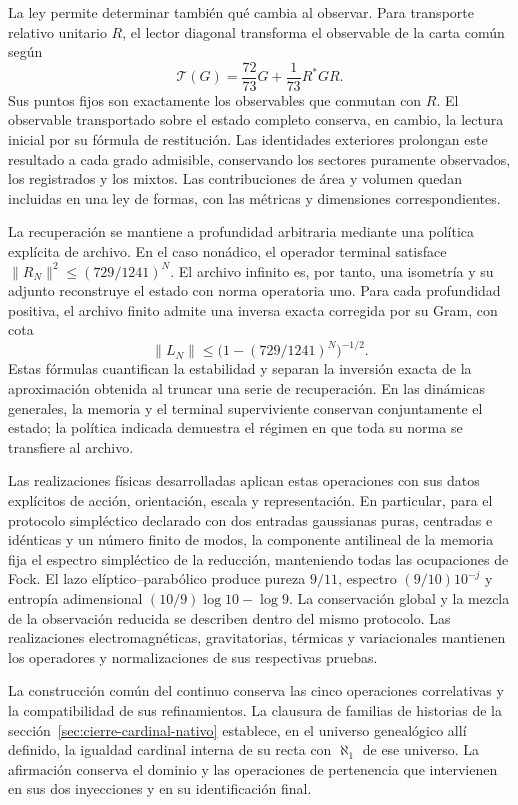 La ley permite determinar también qué cambia al observar. Para transporte relativo unitario \(R\), el lector diagonal transforma el observable de la carta común según
\[
 \mathcal T(G)=\frac{72}{73}G+\frac1{73}R^*GR.
\]
Sus puntos fijos son exactamente los observables que conmutan con \(R\). El observable transportado sobre el estado completo conserva, en cambio, la lectura inicial por su fórmula de restitución. Las identidades exteriores prolongan este resultado a cada grado admisible, conservando los sectores puramente observados, los registrados y los mixtos. Las contribuciones de área y volumen quedan incluidas en una ley de formas, con las métricas y dimensiones correspondientes.

La recuperación se mantiene a profundidad arbitraria mediante una política explícita de archivo. En el caso nonádico, el operador terminal satisface \(\|R_N\|^2\leq(729/1241)^N\). El archivo infinito es, por tanto, una isometría y su adjunto reconstruye el estado con norma operatoria uno. Para cada profundidad positiva, el archivo finito admite una inversa exacta corregida por su Gram, con cota
\[
 \|L_N\|\leq\bigl(1-(729/1241)^N\bigr)^{-1/2}.
\]
Estas fórmulas cuantifican la estabilidad y separan la inversión exacta de la aproximación obtenida al truncar una serie de recuperación. En las dinámicas generales, la memoria y el terminal superviviente conservan conjuntamente el estado; la política indicada demuestra el régimen en que toda su norma se transfiere al archivo.

Las realizaciones físicas desarrolladas aplican estas operaciones con sus datos explícitos de acción, orientación, escala y representación. En particular, para el protocolo simpléctico declarado con dos entradas gaussianas puras, centradas e idénticas y un número finito de modos, la componente antilineal de la memoria fija el espectro simpléctico de la reducción, manteniendo todas las ocupaciones de Fock. El lazo elíptico--parabólico produce pureza \(9/11\), espectro \((9/10)10^{-j}\) y entropía adimensional \((10/9)\log10-\log9\). La conservación global y la mezcla de la observación reducida se describen dentro del mismo protocolo. Las realizaciones electromagnéticas, gravitatorias, térmicas y variacionales mantienen los operadores y normalizaciones de sus respectivas pruebas.

La construcción común del continuo conserva las cinco operaciones correlativas y la compatibilidad de sus refinamientos. La clausura de familias de historias de la sección~\ref{sec:cierre-cardinal-nativo} establece, en el universo genealógico allí definido, la igualdad cardinal interna de su recta con \(\aleph_1\) de ese universo. La afirmación conserva el dominio y las operaciones de pertenencia que intervienen en sus dos inyecciones y en su identificación final.

